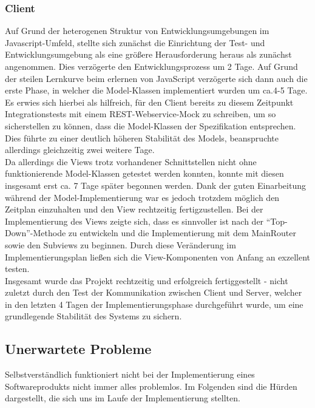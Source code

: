  \subsubsection{Client}
 Auf Grund der heterogenen Struktur von Entwicklungsumgebungen im Javascript-Umfeld, stellte sich zunächst die Einrichtung der Test- und Entwicklungsumgebung als eine größere Herausforderung heraus als zunächst angenommen. Dies verzögerte den Entwicklungsprozess um 2 Tage. 
 Auf Grund der steilen Lernkurve beim erlernen von JavaScript verzögerte sich dann auch die erste Phase, in welcher die Model-Klassen implementiert wurden um ca.4-5 Tage. Es erwies sich hierbei als hilfreich, für den Client bereits zu diesem Zeitpunkt Integrationstests mit einem REST-Webservice-Mock zu schreiben, um so sicherstellen zu können, dass die Model-Klassen der Spezifikation entsprechen. Dies führte zu einer deutlich höheren Stabilität des Models, beanspruchte allerdings gleichzeitig zwei weitere Tage.\\
 Da allerdings die Views trotz vorhandener Schnittstellen nicht ohne funktionierende Model-Klassen getestet werden konnten, konnte mit diesen  insgesamt erst ca. 7 Tage später begonnen werden. Dank der guten Einarbeitung während der Model-Implementierung war es jedoch trotzdem möglich den Zeitplan einzuhalten und den View rechtzeitig fertigzustellen. Bei der Implementierung des Views zeigte sich, dass es sinnvoller ist nach der \enquote{Top-Down}-Methode zu entwickeln und die Implementierung mit dem MainRouter sowie den Subviews zu beginnen. Durch diese Veränderung im Implementierungsplan ließen sich die View-Komponenten von Anfang an exzellent testen.\\
 Insgesamt wurde das Projekt rechtzeitig und erfolgreich fertiggestellt - nicht zuletzt durch den Test der Kommunikation zwischen Client und Server, welcher in den letzten 4 Tagen der Implementierungsphase durchgeführt wurde, um eine grundlegende Stabilität des Systems zu sichern.
 
 
 
 \subsection{Unerwartete Probleme}
 \label{subsec:problems}
 Selbstverständlich funktioniert nicht bei der Implementierung eines Softwareprodukts nicht immer alles problemlos. Im Folgenden sind die Hürden dargestellt, die sich uns im Laufe der Implementierung stellten.
 
